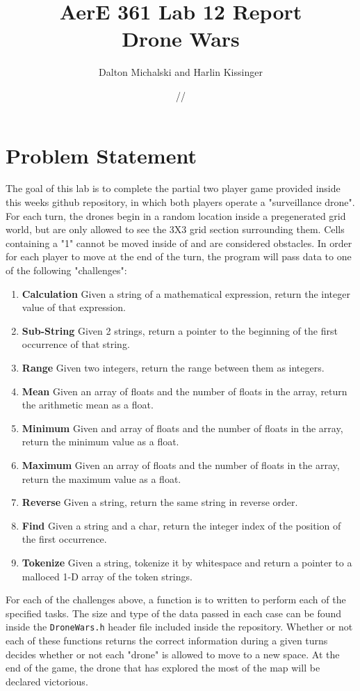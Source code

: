 \documentclass[11pt]{report}
\title{\textbf{AerE 361 Lab 12 Report \\ Drone Wars}}
\author{Dalton Michalski and Harlin Kissinger}
\date{\oldstylenums{10}/\oldstylenums{30}/\oldstylenums{2018}}
\newcommand{\code}[1]{\colorbox{light-gray}{\texttt{#1}}}
\begin{document}
\maketitle
 
\section{Problem Statement}
\begin{item}
\item The goal of this lab is to complete the partial two player game provided inside this weeks github repository, in which both players operate a "surveillance drone".  For each turn, the drones begin in a random location inside a pregenerated grid world, but are only allowed to see the 3X3 grid section surrounding them. Cells containing a "1" cannot be moved inside of and are considered obstacles. In order for each player to move at the end of the turn, the program will pass data to one of the following "challenges": \begin{enumerate}
    \item \textbf{Calculation} Given a string of a mathematical expression, return the integer value of that expression.
    \item \textbf{Sub-String} Given 2 strings, return a pointer to the beginning of the first occurrence of that string.
    \item \textbf{Range} Given two integers, return the range between them as integers.
    \item \textbf{Mean} Given an array of floats and the number of floats in the array, return the arithmetic mean as a float.
    \item \textbf{Minimum} Given and array of floats and the number of floats in the array, return the minimum value as a float.
    \item \textbf{Maximum} Given an array of floats and the number of floats in the array, return the maximum value as a float.
    \item \textbf{Reverse} Given a string, return the same string in reverse order.
    \item \textbf{Find} Given a string and a char, return the integer index of the position of the first occurrence.
    \item \textbf{Tokenize} Given a string, tokenize it by whitespace and return a pointer to a malloced 1-D array of the token strings.
\end{enumerate} 
For each of the challenges above, a function is to written to perform each of the specified tasks. The size and type of the data passed in each case can be found inside the \code{DroneWars.h} header file included inside the repository. Whether or not each of these functions returns the correct information during a given turns decides whether or not each "drone" is allowed to move to a new space. At the end of the game, the drone that has explored the most of the map will be declared victorious.
\end{item}
\newpage
\end{document}
